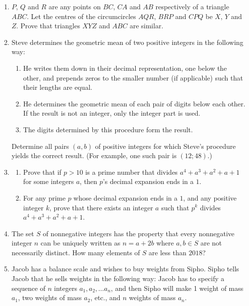 \documentclass{article}
\begin{document}
\begin{enumerate}[1.]

\item %
$P$, $Q$ and $R$ are any points on $BC$, $CA$ and $AB$ respectively of a triangle $ABC$. Let the centres of the circumcircles $AQR$, $BRP$ and $CPQ$ be $X$, $Y$ and $Z$. Prove that triangles $XYZ$ and $ABC$ are similar.


\vspace{6pt}
\item %
Steve determines the geometric mean of two positive integers in the following way:
\begin{enumerate}
	\item He writes them down in their decimal representation, one below the other, and prepends zeros to the smaller number (if applicable) such that their lengths are equal.
	\item He determines the geometric mean of each pair of digits below each other. If the result is not an integer, only the integer part is used.
	\item The digits determined by this procedure form the result.
\end{enumerate}
Determine all pairs $(a,b)$ of positive integers for which Steve's procedure yields the correct result. (For example, one such pair is $(12; 48)$.)


\vspace{6pt}
\item %
\begin{enumerate}
	\item Prove that if $p > 10$ is a prime number that divides $a^4+a^3+a^2+a+1$ for some integers $a$, then $p$'s decimal expansion ends in a $1$.
	\item For any prime $p$ whose decimal expansion ends in a $1$, and any positive integer $k$, prove that there exists an integer $a$ such that $p^k$ divides $a^4+a^3+a^2+a+1$.
\end{enumerate}


\vspace{6pt}
\item %
The set $S$ of nonnegative integers has the property that every nonnegative integer $n$ can be uniquely written as $n = a+2b$ where $a,b \in S$ are not necessarily distinct. How many elements of $S$ are less than $2018$?



\vspace{6pt}
\item %
Jacob has a balance scale and wishes to buy weights from Sipho. Sipho tells Jacob that he sells weights in the following way: Jacob has to specify a sequence of $n$ integers $a_1, a_2, \dotsc a_n$, and then Sipho will make 1 weight of mass $a_1$, two weights of mass $a_2$, etc., and $n$ weights of mass $a_n$.


\end{enumerate}
\end{document}
